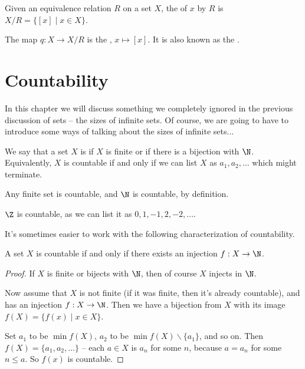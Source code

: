 \documentclass[a4paper]{scrreprt}
\begin{document}
\begin{definition}
	Given an equivalence relation $R$ on a set $X$, the  of $x$ by $R$ is $X/R = \{[x] \mid x \in X\}$.

	The map $q : X \rightarrow X/R$ is the , $x \mapsto [x]$. It is also known as the .
\end{definition}

\chapter{Countability}

In this chapter we will discuss something we completely ignored in the previous discussion of sets -- the sizes of infinite sets. Of course, we are going to have to introduce some ways of talking about the sizes of infinite sets...

\begin{definition}[Countability]
	We say that a set $X$ is  if $X$ is finite or if there is a bijection with $\N$. Equivalently, $X$ is countable if and only if we can list $X$ as $a_1, a_2, \dots$ which might terminate.
\end{definition}

\begin{example}
	Any finite set is countable, and $\N$ is countable, by definition.
\end{example}

\begin{example}[$\Z$ is Countable]
	$\Z$ is countable, as we can list it as $0, 1, -1, 2, -2, \dots$.
\end{example}

It's sometimes easier to work with the following characterization of countability.

\begin{proposition}
	A set $X$ is countable if and only if there exists an injection $f : X \rightarrow \N$.
\end{proposition}
\begin{proof}
If $X$ is finite or bijects with $\N$, then of course $X$ injects in $\N$.

Now assume that $X$ is not finite (if it was finite, then it's already countable), and has an injection $f : X \rightarrow \N$. Then we have a bijection from $X$ with its image $f(X) = \{f(x) \mid x \in X \}$. 

Set $a_1$ to be $\min f(X)$, $a_2$ to be $\min f(X) \backslash \{a_1\}$, and so on. Then $f(X) = \{a_1, a_2, \dots \}$ -- each $a \in X$ is $a_n$ for some $n$, because $a = a_n$ for some $n \leq a$.
So $f(x)$ is countable.
\end{proof}
\end{document}
